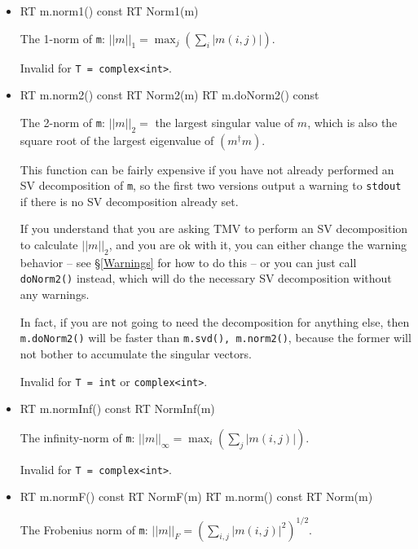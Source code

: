 \documentclass[twoside,letterpaper,11pt]{article}
\renewcommand{\tt}[1]{{\lstinline {#1}}}
\begin{document}
\begin{itemize}

\item
\begin{tmvcode}
RT m.norm1() const
RT Norm1(m)
\end{tmvcode}
The 1-norm of \tt{m}: 
$||m||_1 = \max_j (\sum_i |m(i,j)|)$.  

Invalid for \tt{T = complex<int>}.

\item
\begin{tmvcode}
RT m.norm2() const
RT Norm2(m)
RT m.doNorm2() const
\end{tmvcode}
The 2-norm of \tt{m}: $||m||_2 =$ the largest singular value of $m$, which
is also the square root of the largest eigenvalue of $(m^\dagger m)$.  

This function can be fairly expensive if you have not
already performed an SV decomposition of \tt{m}, so the first two versions
output a warning to \tt{stdout} if there is no SV decomposition already set.

If you understand that you are asking TMV to perform an SV decomposition
to calculate $||m||_2$, and you are ok with it, you can either change the warning
behavior -- see \S\ref{Warnings} for how to do this --
or you can just call \tt{doNorm2()} instead, which will do the 
necessary SV decomposition without any warnings.

In fact, if you are not going to need the decomposition for anything else,
then \tt{m.doNorm2()} will be faster than \tt{m.svd(), m.norm2()}, because the 
former will not bother to accumulate the singular vectors.

Invalid for \tt{T = int} or \tt{complex<int>}.

\item
\begin{tmvcode}
RT m.normInf() const
RT NormInf(m)
\end{tmvcode}
The infinity-norm of \tt{m}: 
$||m||_\infty = \max_i (\sum_j |m(i,j)|)$.  

Invalid for \tt{T = complex<int>}.

\item
\begin{tmvcode}
RT m.normF() const
RT NormF(m)
RT m.norm() const
RT Norm(m)
\end{tmvcode}
The Frobenius norm of \tt{m}: 
$||m||_F = (\sum_{i,j} |m(i,j)|^2)^{1/2}$.  


\end{itemize}
\end{document}
